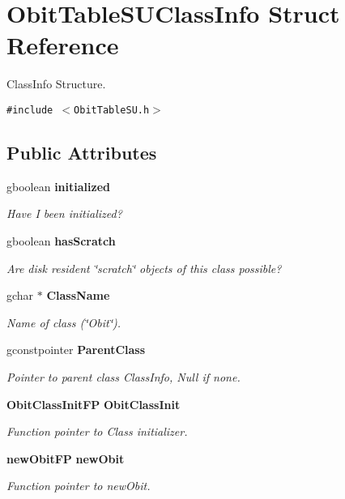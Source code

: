 \section{Obit\-Table\-SUClass\-Info Struct Reference}
\label{structObitTableSUClassInfo}
Class\-Info Structure.  


{\tt \#include $<$Obit\-Table\-SU.h$>$}

\subsection*{Public Attributes}
\begin{CompactItemize}
\item 
gboolean {\bf initialized}
\begin{CompactList}\small\item\em Have I been initialized? \item\end{CompactList}\item 
gboolean {\bf has\-Scratch}
\begin{CompactList}\small\item\em Are disk resident \char`\"{}scratch\char`\"{} objects of this class possible? \item\end{CompactList}\item 
gchar $\ast$ {\bf Class\-Name}
\begin{CompactList}\small\item\em Name of class (\char`\"{}Obit\char`\"{}). \item\end{CompactList}\item 
gconstpointer {\bf Parent\-Class}
\begin{CompactList}\small\item\em Pointer to parent class Class\-Info, Null if none. \item\end{CompactList}\item 
{\bf Obit\-Class\-Init\-FP} {\bf Obit\-Class\-Init}
\begin{CompactList}\small\item\em Function pointer to Class initializer. \item\end{CompactList}\item 
{\bf new\-Obit\-FP} {\bf new\-Obit}
\begin{CompactList}\small\item\em Function pointer to new\-Obit. \item\end{CompactList}\item 

\end{CompactItemize}
